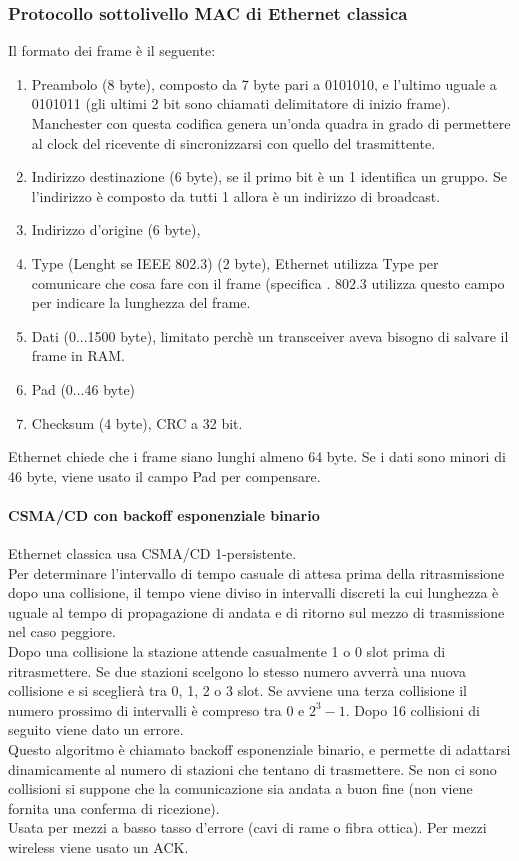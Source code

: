 \documentclass{article}
\begin{document}
\subsubsection{Protocollo sottolivello MAC di Ethernet classica}
Il formato dei frame è il seguente:
\begin{enumerate}
  \item Preambolo (8 byte), composto da 7 byte pari a 0101010, e l'ultimo uguale a 0101011 (gli ultimi 2 bit sono chiamati delimitatore di inizio frame). \\
  Manchester con questa codifica genera un'onda quadra in grado di permettere al clock del ricevente di sincronizzarsi con quello del trasmittente. \\
  \item Indirizzo destinazione (6 byte), se il primo bit è un 1 identifica un gruppo. Se l'indirizzo è composto da tutti 1 allora è un indirizzo di broadcast.
  \item Indirizzo d'origine (6 byte), 
  \item Type (Lenght se IEEE 802.3) (2 byte), Ethernet utilizza Type per comunicare che cosa fare con il frame (specifica . 802.3 utilizza questo campo per indicare la lunghezza del frame. 
  \item Dati (0...1500 byte), limitato perchè un transceiver aveva bisogno di salvare il frame in RAM. 
  \item Pad (0...46 byte)
  \item Checksum (4 byte), CRC a 32 bit. 
\end{enumerate}
Ethernet chiede che i frame siano lunghi almeno 64 byte. Se i dati sono minori di 46 byte, viene usato il campo Pad per compensare.
\paragraph{CSMA/CD con backoff esponenziale binario}
Ethernet classica usa CSMA/CD 1-persistente. \\
Per determinare l'intervallo di tempo casuale di attesa prima della ritrasmissione dopo una collisione, il tempo viene diviso in intervalli discreti la cui lunghezza è uguale al tempo di propagazione di andata e di ritorno sul mezzo di trasmissione nel caso peggiore.\\
Dopo una collisione la stazione attende casualmente 1 o 0 slot prima di ritrasmettere. Se due stazioni scelgono lo stesso numero avverrà una nuova collisione e si sceglierà tra 0, 1, 2 o 3 slot. Se avviene una terza collisione il numero prossimo di intervalli è compreso tra 0 e $2^3 -1$. Dopo 16 collisioni di seguito viene dato un errore. \\
Questo algoritmo è chiamato backoff esponenziale binario, e permette di adattarsi dinamicamente al numero di stazioni che tentano di trasmettere. Se non ci sono collisioni si suppone che la comunicazione sia andata a buon fine (non viene fornita una conferma di ricezione). \\ Usata per mezzi a basso tasso d'errore (cavi di rame o fibra ottica). Per mezzi wireless viene usato un ACK.
\end{document}
